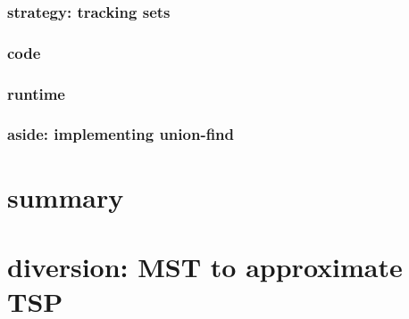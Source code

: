 

\subsubsection{strategy: tracking sets}



\subsubsection{code}



\subsubsection{runtime}



\subsubsection{aside: implementing union-find}




\section{summary}



\section{diversion: MST to approximate TSP}


